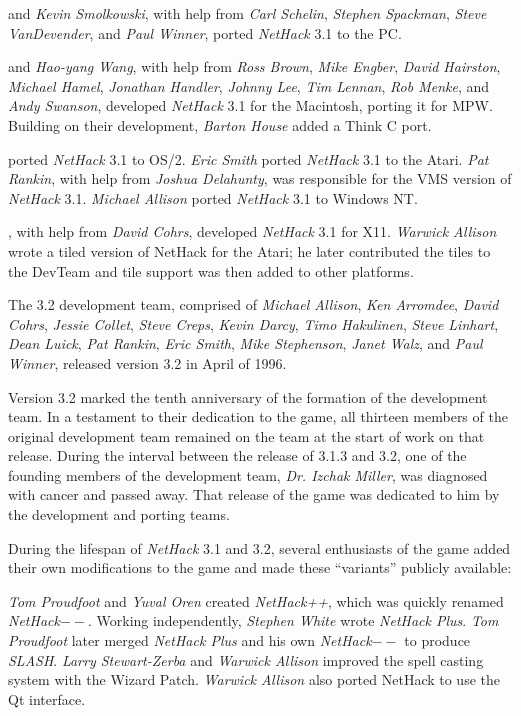 \medskip
{} and {\it Kevin Smolkowski}, with help from
{\it Carl Schelin}, {\it Stephen Spackman}, {\it Steve VanDevender},
and {\it Paul Winner}, ported {\it NetHack\/} 3.1 to the PC.

\medskip
{} and {\it Hao-yang Wang},
with help from {\it Ross Brown}, {\it Mike Engber}, {\it David Hairston},
{\it Michael Hamel}, {\it Jonathan Handler}, {\it Johnny Lee},
{\it Tim Lennan}, {\it Rob Menke}, and {\it Andy Swanson},
developed {\it NetHack\/} 3.1 for the Macintosh, porting it for MPW.
Building on their development, {\it Barton House} added a Think C port.

\medskip
{} ported {\it NetHack\/} 3.1 to OS/2.
{\it Eric Smith\/} ported {\it NetHack\/} 3.1 to the Atari.
{\it Pat Rankin}, with help from {\it Joshua Delahunty},
was responsible for the VMS version of {\it NetHack\/} 3.1.
{\it Michael Allison} ported {\it NetHack\/} 3.1 to Windows NT.

\medskip
{}, with help from {\it David Cohrs}, developed {\it NetHack\/}
3.1 for X11.
{\it Warwick Allison} wrote a tiled version of NetHack for the Atari;
he later contributed the tiles to the DevTeam and tile support was
then added to other platforms.

\medskip
\nd The 3.2 development team, comprised of {\it Michael Allison}, {\it Ken
Arromdee}, {\it David Cohrs}, {\it Jessie Collet}, {\it Steve Creps}, {\it
Kevin Darcy}, {\it Timo Hakulinen}, {\it Steve Linhart}, {\it Dean Luick},
{\it Pat Rankin}, {\it Eric Smith}, {\it Mike Stephenson}, {\it Janet Walz},
and {\it Paul Winner}, released version 3.2 in April of 1996.

\medskip
\nd Version 3.2 marked the tenth anniversary of the formation of the development
team.  In a testament to their dedication to the game, all thirteen members
of the original development team remained on the team at the start of work on
that release.  During the interval between the release of 3.1.3 and 3.2,
one of the founding members of the development team, {\it Dr. Izchak Miller},
was diagnosed with cancer and passed away.  That release of the game was
dedicated to him by the development and porting teams.

\medskip
During the lifespan of {\it NetHack\/} 3.1 and 3.2, several enthusiasts
of the game added
their own modifications to the game and made these ``variants'' publicly
available:

\medskip
{\it Tom Proudfoot} and {\it Yuval Oren} created {\it NetHack++},
which was quickly renamed {\it NetHack$--$}.
Working independently, {\it Stephen White} wrote {\it NetHack Plus}.
{\it Tom Proudfoot} later merged {\it NetHack Plus}
and his own {\it NetHack$--$} to produce {\it SLASH}.
{\it Larry Stewart-Zerba} and {\it Warwick Allison} improved the spell
casting system with the Wizard Patch.
{\it Warwick Allison} also ported NetHack to use the Qt interface.

